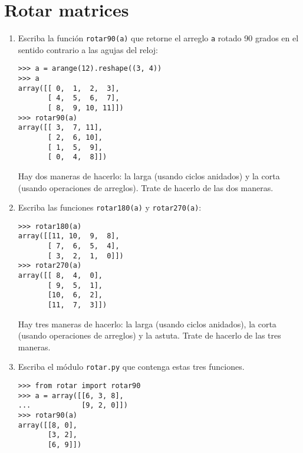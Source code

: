\section{Rotar matrices}

\begin{enumerate}
\item
  Escriba la función \lstinline!rotar90(a)! que retorne el arreglo
  \lstinline!a! rotado 90 grados en el sentido contrario a las agujas
  del reloj:

\begin{lstlisting}
>>> a = arange(12).reshape((3, 4))
>>> a
array([[ 0,  1,  2,  3],
       [ 4,  5,  6,  7],
       [ 8,  9, 10, 11]])
>>> rotar90(a)
array([[ 3,  7, 11],
       [ 2,  6, 10],
       [ 1,  5,  9],
       [ 0,  4,  8]])
\end{lstlisting}

  Hay dos maneras de hacerlo: la larga (usando ciclos anidados) y la
  corta (usando operaciones de arreglos). Trate de hacerlo de las dos
  maneras.
\item
  Escriba las funciones \lstinline!rotar180(a)! y
  \lstinline!rotar270(a)!:

\begin{lstlisting}
>>> rotar180(a)
array([[11, 10,  9,  8],
       [ 7,  6,  5,  4],
       [ 3,  2,  1,  0]])
>>> rotar270(a)
array([[ 8,  4,  0],
       [ 9,  5,  1],
       [10,  6,  2],
       [11,  7,  3]])
\end{lstlisting}

  Hay tres maneras de hacerlo: la larga (usando ciclos anidados), la
  corta (usando operaciones de arreglos) y la astuta. Trate de hacerlo
  de las tres maneras.
\item
  Escriba el módulo \lstinline!rotar.py! que contenga estas tres
  funciones. %

\begin{lstlisting}
>>> from rotar import rotar90
>>> a = array([[6, 3, 8],
...            [9, 2, 0]])
>>> rotar90(a)
array([[8, 0],
       [3, 2],
       [6, 9]])
\end{lstlisting}
\end{enumerate}
